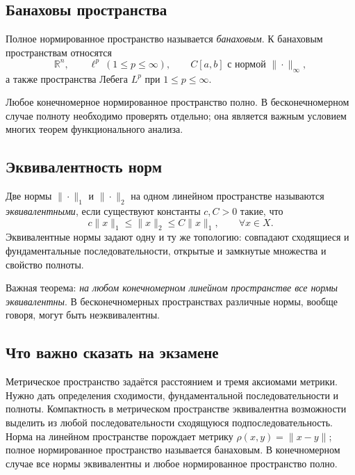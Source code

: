\subsection{Банаховы пространства}

Полное нормированное пространство называется \emph{банаховым}. К банаховым
пространствам относятся
\[
    \mathbb R^n,\qquad \ell^p\ (1\leq p\leq\infty),\qquad
    C[a,b]\text{ с нормой }\|\cdot\|_\infty,
\]
а также пространства Лебега $L^p$ при $1\leq p\leq\infty$.

Любое конечномерное нормированное пространство полно. В бесконечномерном случае
полноту необходимо проверять отдельно; она является важным условием многих
теорем функционального анализа.

\subsection{Эквивалентность норм}

Две нормы $\|\cdot\|_1$ и $\|\cdot\|_2$ на одном линейном пространстве называются
\emph{эквивалентными}, если существуют константы $c,C>0$ такие, что
\[
    c\|x\|_1\leq\|x\|_2\leq C\|x\|_1,
    \qquad \forall x\in X.
\]
Эквивалентные нормы задают одну и ту же топологию: совпадают сходящиеся и
фундаментальные последовательности, открытые и замкнутые множества и свойство
полноты.

Важная теорема: \emph{на любом конечномерном линейном пространстве все нормы
эквивалентны}. В бесконечномерных пространствах различные нормы, вообще говоря,
могут быть неэквивалентны.

\subsection{Что важно сказать на экзамене}

Метрическое пространство задаётся расстоянием и тремя аксиомами метрики. Нужно
дать определения сходимости, фундаментальной последовательности и полноты.
Компактность в метрическом пространстве эквивалентна возможности выделить из
любой последовательности сходящуюся подпоследовательность. Норма на линейном
пространстве порождает метрику $\rho(x,y)=\|x-y\|$; полное нормированное
пространство называется банаховым. В конечномерном случае все нормы эквивалентны
и любое нормированное пространство полно.

\newpage

